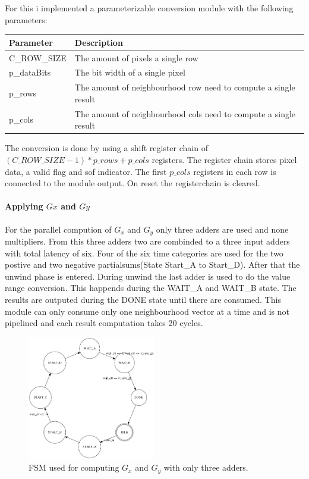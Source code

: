 \documentclass[a4paper,fontsize=12pt]{scrartcl}
\begin{document}
For this i implemented a parameterizable conversion module with the following parameters:
\begin{table}[h]
\begin{tabularx}{\textwidth}{|l|X|}
\hline
\textbf{Parameter} & \textbf{Description} \\ \hline
\hline
C\_ROW\_SIZE & The amount of pixels a single row \\ \hline
p\_dataBits  & The bit width of a single pixel \\ \hline
p\_rows      & The amount of neighbourhood row need to compute a single result \\ \hline
p\_cols      & The amount of neighbourhood cols need to compute a single result \\ \hline
\end{tabularx}
\end{table}


The conversion is done by using a shift register chain of $(C\_ROW\_SIZE-1)*p\_rows+p\_cols$ registers. The register chain stores pixel data, a valid flag and sof indicator. The first $p\_cols$ registers in each row is connected to the module output. On reset the registerchain is cleared.

\paragraph{Applying $Gx$ and $Gy$}
For the parallel  compution of $G_x$ and $G_y$ only three adders are used and none multipliers. From this three adders two are combinded to a three input adders with total latency of six. Four of the six time categories are used for the two postive and two negative partialsums(State Start\_A to Start\_D).  After that the unwind phase is entered. During unwind the last adder is used to do the value range conversion. This happends during the WAIT\_A and WAIT\_B state. The results are outputed during the DONE state until there are consumed. This module can only consume only one neighbourhood vector at a time and is not pipelined and each result computation takes 20 cycles.
\begin{figure}[h]
  \centering
  \includegraphics[width=0.5\textwidth]{circofsm.png} 
  \caption{FSM used for computing $G_x$ and $G_y$ with only three adders.}
\end{figure}
\end{document}
